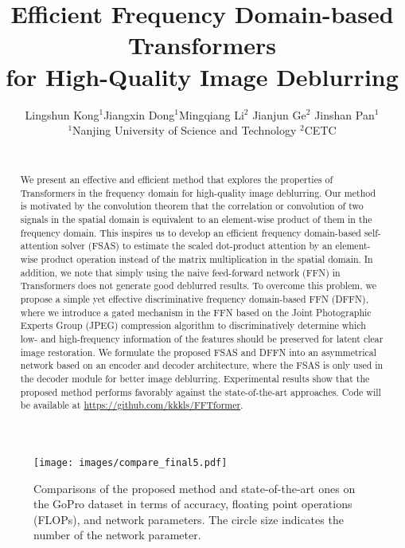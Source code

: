 \documentclass[10pt,twocolumn,letterpaper]{article}
\begin{document}
\title{Efficient Frequency Domain-based Transformers \\for High-Quality Image Deblurring}

\author{Lingshun Kong$^{1}$\quad Jiangxin Dong$^{1}$\quad Mingqiang Li$^{2}$ \quad Jianjun Ge$^{2}$ \quad Jinshan Pan$^{1}$ \\
$^{1}$Nanjing University of Science and Technology \quad $^{2}$CETC\\
\\
}
\maketitle

\begin{abstract}
We present an effective and efficient method that explores the properties of Transformers in the frequency domain for high-quality image deblurring.
Our method is motivated by the convolution theorem that the correlation or convolution of two signals in the spatial domain is equivalent to an element-wise product of them in the frequency domain.
This inspires us to develop an efficient frequency domain-based self-attention solver (FSAS) to estimate the scaled dot-product attention by an element-wise product operation instead of the matrix multiplication in the spatial domain.
In addition, we note that simply using the naive feed-forward network (FFN) in Transformers does not generate good deblurred results. To overcome this problem, we propose a simple yet effective discriminative frequency domain-based FFN (DFFN), where we introduce a gated mechanism in the FFN based on the Joint Photographic Experts Group (JPEG) compression algorithm to discriminatively determine which low- and high-frequency information of the features should be preserved for latent clear image restoration.
We formulate the proposed FSAS and DFFN into an asymmetrical network based on an encoder and decoder architecture, where the FSAS is only used in the decoder module for better image deblurring.
Experimental results show that the proposed method performs favorably against the state-of-the-art approaches. Code will be available at \url{https://github.com/kkkls/FFTformer}.


\end{abstract}


\begin{figure}[!t]
    \centering
    \vspace{0mm}
 \texttt{[image: images/compare\_final5.pdf]}
 \vspace{-6mm}
 \caption{Comparisons of the proposed method and state-of-the-art ones on the GoPro dataset \cite{GoPro} in terms of accuracy, floating point operations (FLOPs), and network parameters. The circle size indicates the number of the network parameter. }
 \label{fig:Params}
 \vspace{-5mm}
\end{figure}
\end{document}
